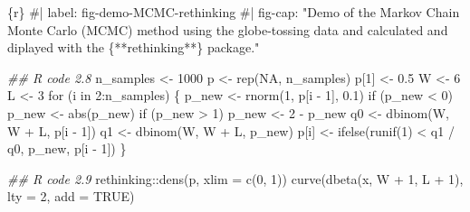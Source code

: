 \documentclass[
  letterpaper,
  DIV=11,
  numbers=noendperiod]{scrreprt}
\newenvironment{Shaded}{\begin{snugshade}}{\end{snugshade}}
\newcommand{\AttributeTok}[1]{\textcolor[rgb]{0.40,0.45,0.13}{#1}}
\newcommand{\CommentTok}[1]{\textcolor[rgb]{0.37,0.37,0.37}{#1}}
\newcommand{\ConstantTok}[1]{\textcolor[rgb]{0.56,0.35,0.01}{#1}}
\newcommand{\ControlFlowTok}[1]{\textcolor[rgb]{0.00,0.23,0.31}{#1}}
\newcommand{\DecValTok}[1]{\textcolor[rgb]{0.68,0.00,0.00}{#1}}
\newcommand{\DocumentationTok}[1]{\textcolor[rgb]{0.37,0.37,0.37}{\textit{#1}}}
\newcommand{\FloatTok}[1]{\textcolor[rgb]{0.68,0.00,0.00}{#1}}
\newcommand{\FunctionTok}[1]{\textcolor[rgb]{0.28,0.35,0.67}{#1}}
\newcommand{\InformationTok}[1]{\textcolor[rgb]{0.37,0.37,0.37}{#1}}
\newcommand{\NormalTok}[1]{\textcolor[rgb]{0.00,0.23,0.31}{#1}}
\newcommand{\OtherTok}[1]{\textcolor[rgb]{0.00,0.23,0.31}{#1}}
\newcommand{\SpecialCharTok}[1]{\textcolor[rgb]{0.37,0.37,0.37}{#1}}
\begin{document}
\begin{Shaded}
\begin{Highlighting}[]
\InformationTok{\textasciigrave{}\textasciigrave{}\textasciigrave{}\{r\}}
\CommentTok{\#| label: fig{-}demo{-}MCMC{-}rethinking}
\CommentTok{\#| fig{-}cap: "Demo of the Markov Chain Monte Carlo (MCMC) method using the globe{-}tossing data and calculated and diplayed with the \{**rethinking**\} package."}

\DocumentationTok{\#\# R code 2.8}
\NormalTok{n\_samples }\OtherTok{\textless{}{-}} \DecValTok{1000}
\NormalTok{p }\OtherTok{\textless{}{-}} \FunctionTok{rep}\NormalTok{(}\ConstantTok{NA}\NormalTok{, n\_samples)}
\NormalTok{p[}\DecValTok{1}\NormalTok{] }\OtherTok{\textless{}{-}} \FloatTok{0.5}
\NormalTok{W }\OtherTok{\textless{}{-}} \DecValTok{6}
\NormalTok{L }\OtherTok{\textless{}{-}} \DecValTok{3}
\ControlFlowTok{for}\NormalTok{ (i }\ControlFlowTok{in} \DecValTok{2}\SpecialCharTok{:}\NormalTok{n\_samples) \{}
\NormalTok{  p\_new }\OtherTok{\textless{}{-}} \FunctionTok{rnorm}\NormalTok{(}\DecValTok{1}\NormalTok{, p[i }\SpecialCharTok{{-}} \DecValTok{1}\NormalTok{], }\FloatTok{0.1}\NormalTok{)}
  \ControlFlowTok{if}\NormalTok{ (p\_new }\SpecialCharTok{\textless{}} \DecValTok{0}\NormalTok{) p\_new }\OtherTok{\textless{}{-}} \FunctionTok{abs}\NormalTok{(p\_new)}
  \ControlFlowTok{if}\NormalTok{ (p\_new }\SpecialCharTok{\textgreater{}} \DecValTok{1}\NormalTok{) p\_new }\OtherTok{\textless{}{-}} \DecValTok{2} \SpecialCharTok{{-}}\NormalTok{ p\_new}
\NormalTok{  q0 }\OtherTok{\textless{}{-}} \FunctionTok{dbinom}\NormalTok{(W, W }\SpecialCharTok{+}\NormalTok{ L, p[i }\SpecialCharTok{{-}} \DecValTok{1}\NormalTok{])}
\NormalTok{  q1 }\OtherTok{\textless{}{-}} \FunctionTok{dbinom}\NormalTok{(W, W }\SpecialCharTok{+}\NormalTok{ L, p\_new)}
\NormalTok{  p[i] }\OtherTok{\textless{}{-}} \FunctionTok{ifelse}\NormalTok{(}\FunctionTok{runif}\NormalTok{(}\DecValTok{1}\NormalTok{) }\SpecialCharTok{\textless{}}\NormalTok{ q1 }\SpecialCharTok{/}\NormalTok{ q0, p\_new, p[i }\SpecialCharTok{{-}} \DecValTok{1}\NormalTok{])}
\NormalTok{\}}

\DocumentationTok{\#\# R code 2.9}
\NormalTok{rethinking}\SpecialCharTok{::}\FunctionTok{dens}\NormalTok{(p, }\AttributeTok{xlim =} \FunctionTok{c}\NormalTok{(}\DecValTok{0}\NormalTok{, }\DecValTok{1}\NormalTok{))}
\FunctionTok{curve}\NormalTok{(}\FunctionTok{dbeta}\NormalTok{(x, W }\SpecialCharTok{+} \DecValTok{1}\NormalTok{, L }\SpecialCharTok{+} \DecValTok{1}\NormalTok{), }\AttributeTok{lty =} \DecValTok{2}\NormalTok{, }\AttributeTok{add =} \ConstantTok{TRUE}\NormalTok{)}

\InformationTok{\textasciigrave{}\textasciigrave{}\textasciigrave{}}
\end{Highlighting}
\end{Shaded}
\end{document}
